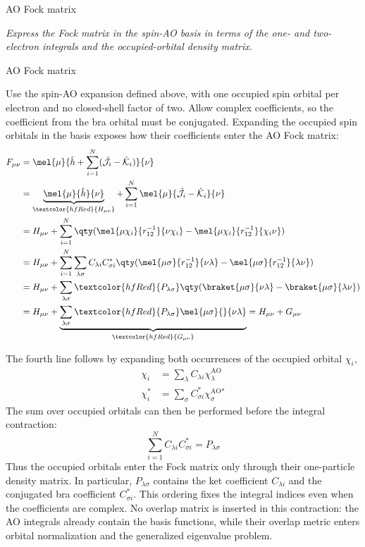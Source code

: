 \documentclass[11pt,a4paper,titlepage]{article}
\numberwithin{equation}{section}
\newcommand{\hh}{\Hat{h}}
\newcommand{\chJ}{\Hat{\mathcal{J}}}
\newcommand{\chK}{\Hat{\mathcal{K}}}
\newcommand{\red}[1]{\textcolor{hfRed}{#1}}
\newcommand{\violet}[1]{\textcolor{hfViolet}{#1}}
\begin{document}
\begin{hfexercise}{AO Fock matrix}

\violet{\textit{Express the Fock matrix in the spin-AO basis in terms of
the one- and two-electron integrals and the occupied-orbital density matrix.}}

\end{hfexercise}
\begin{hfsolution}{AO Fock matrix}

Use the spin-AO expansion defined above, with one occupied spin orbital per
electron and no closed-shell factor of two. Allow complex coefficients,
so the coefficient from the bra orbital must be conjugated.
Expanding the occupied spin orbitals in the basis exposes how their
coefficients enter the AO Fock matrix:
\begin{equation}
\begin{split}
  F_{\mu\nu}
  &=\mel{\mu}{\hh+\sum_{i=1}^{N}(\chJ_i-\chK_i)}{\nu}
  \\
  &=\underbrace{\mel{\mu}{\hh}{\nu}}_{\red{H_{\mu\nu}}}
  +\sum_{i=1}^{N}\mel{\mu}{\chJ_i-\chK_i}{\nu}
  \\
  &=H_{\mu\nu}+\sum_{i=1}^{N}\qty(
    \mel{\mu\chi_i}{r_{12}^{-1}}{\nu\chi_i}
    -\mel{\mu\chi_i}{r_{12}^{-1}}{\chi_i\nu}
  )
  \\
  &=H_{\mu\nu}
  +\sum_{i=1}^{N}\sum_{\lambda\sigma}
    C_{\lambda i}C_{\sigma i}^*
    \qty(
      \mel{\mu\sigma}{r_{12}^{-1}}{\nu\lambda}
      -\mel{\mu\sigma}{r_{12}^{-1}}{\lambda\nu}
    )
  \\
  &=H_{\mu\nu}
  +\sum_{\lambda\sigma}\red{P_{\lambda\sigma}}
    \qty(\braket{\mu\sigma}{\nu\lambda}
    -\braket{\mu\sigma}{\lambda\nu})
  \\
  &=H_{\mu\nu}
  +\underbrace{\sum_{\lambda\sigma}\red{P_{\lambda\sigma}}
    \mel{\mu\sigma}{}{\nu\lambda}}_{\red{G_{\mu\nu}}}
  =H_{\mu\nu}+G_{\mu\nu}
\end{split}
\end{equation}

The fourth line follows by expanding both occurrences of the occupied orbital
$\chi_i$,
\begin{equation}
\begin{split}
  \chi_i
  &=
  \sum_\lambda C_{\lambda i}\chi_\lambda^\text{AO}
  \\
  \chi_i^*
  &=
  \sum_\sigma C_{\sigma i}^*\chi_\sigma^{\text{AO}*}
\end{split}
\end{equation}
The sum over occupied orbitals can then be performed before the integral
contraction:
\begin{equation}
  \sum_{i=1}^{N}C_{\lambda i}C_{\sigma i}^*
  =
  P_{\lambda\sigma}
\end{equation}
Thus the occupied orbitals enter the Fock matrix only through their
one-particle density matrix.
In particular, $P_{\lambda\sigma}$ contains the ket coefficient
$C_{\lambda i}$ and the conjugated bra coefficient $C_{\sigma i}^*$.
This ordering fixes the integral indices even when the coefficients are
complex. No overlap matrix is inserted in this contraction: the AO
integrals already contain the basis functions, while their overlap metric
enters orbital normalization and the generalized eigenvalue problem.


\end{hfsolution}
\end{document}
